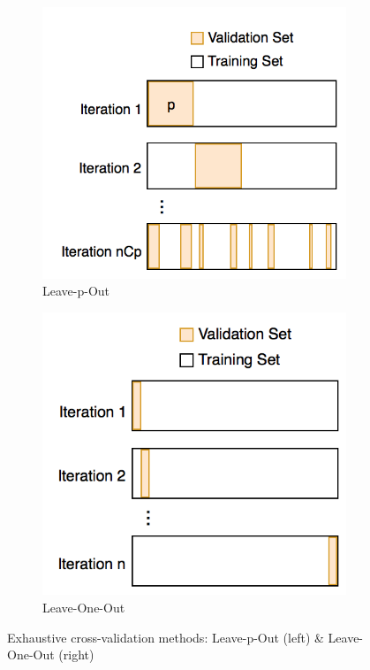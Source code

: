 \begin{figure}
\centering
\begin{subfigure}
  \centering
  \includegraphics[width=.4\linewidth]{leavep.png}
  \caption{Leave-p-Out}
  \end{subfigure}
 \begin{subfigure}
  \centering
  \includegraphics[width=.37\linewidth]{leave1.png}
  \caption{Leave-One-Out}
  \end{subfigure}
  \caption{Exhaustive cross-validation methods: Leave-p-Out (left) \& Leave-One-Out (right)}
  \label{fig:leavep}
\end{figure}

